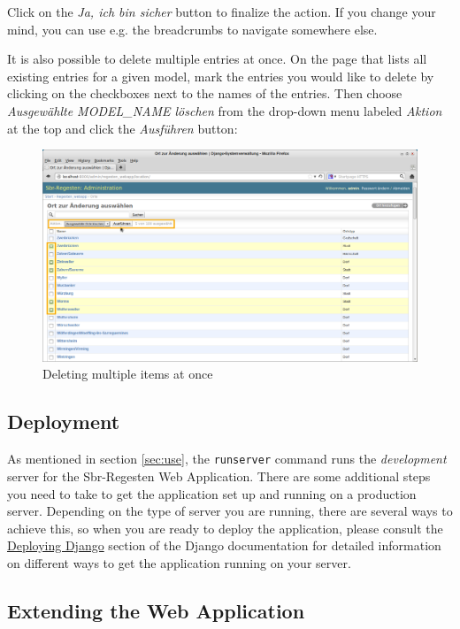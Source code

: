 Click on the \emph{Ja, ich bin sicher} button to finalize the action.
If you change your mind, you can use e.g. the breadcrumbs to navigate
somewhere else.

It is also possible to delete multiple entries at once. On the page
that lists all existing entries for a given model, mark the entries
you would like to delete by clicking on the checkboxes next to the
names of the entries. Then choose \emph{Ausgewählte MODEL\_NAME
  löschen} from the drop-down menu labeled \emph{Aktion} at the top
and click the \emph{Ausführen} button:

\begin{figure}[h]
  \centering
  \includegraphics[scale=0.3]{img/delete-multiple}
  \caption{Deleting multiple items at once}
  \label{fig:delete-multiple}
\end{figure}

\subsection{Deployment}
\label{sec:deploy}

As mentioned in section \ref{sec:use}, the \texttt{runserver} command
runs the \emph{development} server for the Sbr-Regesten Web
Application. There are some additional steps you need to take to get
the application set up and running on a production server. Depending
on the type of server you are running, there are several ways to
achieve this, so when you are ready to deploy the application, please
consult the
\href{https://docs.djangoproject.com/en/1.4/howto/deployment/}{Deploying
  Django} section of the Django documentation for detailed information
on different ways to get the application running on your server.

\subsection{Extending the Web Application}
\label{sec:extend}

